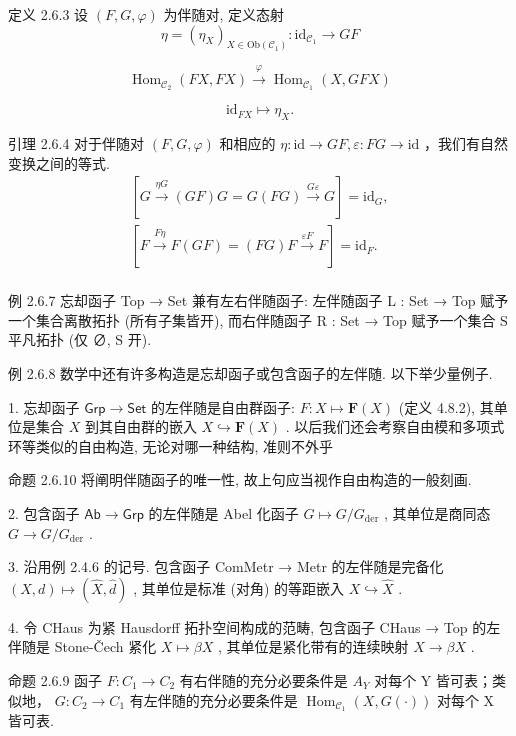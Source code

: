 \documentclass[]{article}
\begin{document}
定义 2.6.3 设 $(F, G, \varphi)$ 为伴随对, 定义态射 $$
\eta = (\eta_ {X}) _ {X \in \mathrm{Ob} (\mathcal {C} _ {1})}: \mathrm{id} _ {\mathcal {C} _ {1}} \longrightarrow G F
$$

$$
\operatorname{Hom} _ {\mathcal {C} _ {2}} (F X, F X) \xrightarrow {\varphi} \operatorname{Hom} _ {\mathcal {C} _ {1}} (X, G F X)
$$

$$
\mathrm{id} _ {F X} \longmapsto \eta_ {X}.
$$

引理 2.6.4 对于伴随对 $(F,G,\varphi)$ 和相应的 $\eta:\mathrm{id}\rightarrow GF,\varepsilon:FG\rightarrow\mathrm{id}$ ，我们有自然变换之间的等式. $$
\begin{array}{l} \left[ G \xrightarrow {\eta G} (G F) G = G (F G) \xrightarrow {G \varepsilon} G \right] = \mathrm{id} _ {G},  \\ \left[ F \stackrel {F \eta} {\longrightarrow} F (G F) = (F G) F \stackrel {\varepsilon F} {\longrightarrow} F \right] = \mathrm{id} _ {F}. \\ \end{array}
$$

例 2.6.7 忘却函子 Top → Set 兼有左右伴随函子: 左伴随函子 L : Set → Top 赋予一个集合离散拓扑 (所有子集皆开), 而右伴随函子 R : Set → Top 赋予一个集合 S 平凡拓扑 (仅 ∅, S 开). 

例 2.6.8 数学中还有许多构造是忘却函子或包含函子的左伴随. 以下举少量例子. 

1. 忘却函子 $\mathsf{Grp} \to \mathsf{Set}$ 的左伴随是自由群函子: $F: X \mapsto \mathbf{F}(X)$ (定义 4.8.2), 其单位是集合 $X$ 到其自由群的嵌入 $X \hookrightarrow \mathbf{F}(X)$ . 以后我们还会考察自由模和多项式环等类似的自由构造, 无论对哪一种结构, 准则不外乎 

命题 2.6.10 将阐明伴随函子的唯一性, 故上句应当视作自由构造的一般刻画. 

2. 包含函子 $\mathsf{Ab} \to \mathsf{Grp}$ 的左伴随是 Abel 化函子 $G \mapsto G / G_{\mathrm{der}}$ , 其单位是商同态 $G \to G / G_{\mathrm{der}}$ . 

3. 沿用例 2.4.6 的记号. 包含函子 ComMetr → Metr 的左伴随是完备化 $(X, d) \mapsto (\hat{X}, \hat{d})$ , 其单位是标准 (对角) 的等距嵌入 $X \hookrightarrow \hat{X}$ . 

4. 令 CHaus 为紧 Hausdorff 拓扑空间构成的范畴, 包含函子 CHaus → Top 的左伴随是 Stone-Čech 紧化 $X \mapsto \beta X$ , 其单位是紧化带有的连续映射 $X \to \beta X$ . 

命题 2.6.9 函子 $F: C_{1} \rightarrow C_{2}$ 有右伴随的充分必要条件是 $A_{Y}$ 对每个 Y 皆可表；类似地， $G: C_{2} \rightarrow C_{1}$ 有左伴随的充分必要条件是 $\operatorname{Hom}_{\mathcal{C}_{1}}(X, G(\cdot))$ 对每个 X 皆可表. 
\end{document}
